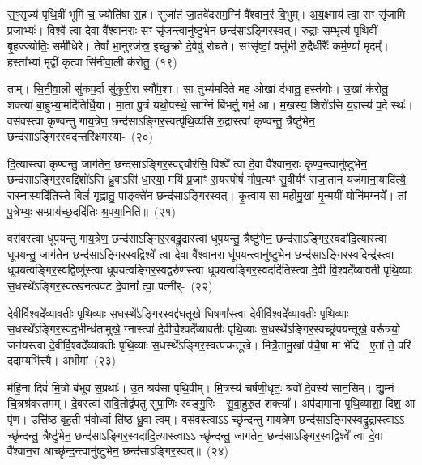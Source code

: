 स॒ꣳ॒सृज्य॑ पृथि॒वीं भूमिं॑ च॒ ज्योति॑षा स॒ह। सुजा॑तं जा॒तवे॑दसम॒ग्निं वै᳚श्वान॒रं वि॒भुम्। अ॒य॒क्ष्माय॑ त्वा॒ सꣳ सृ॑जामि प्र॒जाभ्यः॑। विश्वे᳚ त्वा दे॒वा वै᳚श्वान॒राः सꣳ सृ॑ज॒न्त्वानु॑ष्टुभेन॒ छन्द॑साऽङ्गिर॒स्वत्। रु॒द्राः स॒म्भृत्य॑ पृथि॒वीं बृ॒हज्ज्योतिः॒ समी॑धिरे। तेषां᳚ भा॒नुरज॑स्र॒ इच्छु॒क्रो दे॒वेषु॑ रोचते। सꣳसृ॑ष्टां॒ वसु॑भी रु॒द्रैर्धीरैः᳚ कर्म॒ण्यां᳚ मृदम्᳚। हस्ता᳚भ्यां मृ॒द्वीं कृ॒त्वा सि॑नीवा॒ली क॑रोतु॒~(१९)

ताम्। सि॒नी॒वा॒ली सु॑कप॒र्दा सु॑कुरी॒रा स्वौ॑प॒शा। सा तुभ्य॑मदिते मह॒ ओखां द॑धातु॒ हस्त॑योः। उ॒खां क॑रोतु॒ शक्त्या॑ बा॒हुभ्या॒मदि॑तिर्धि॒या। मा॒ता पु॒त्रं यथो॒पस्थे॒ साग्निं बि॑भर्तु॒ गर्भ॒ आ। म॒खस्य॒ शिरो॑\-ऽसि य॒ज्ञस्य॑ प॒दे स्थः॑। वस॑वस्त्वा कृण्वन्तु गाय॒त्रेण॒ छन्द॑साऽङ्गिर॒स्वत्पृ॑थि॒व्य॑सि रु॒द्रास्त्वा॑ कृण्वन्तु॒ त्रैष्टु॑भेन॒ छन्द॑साऽङ्गिर॒स्वद॒न्तरि॑क्षमस्या-~(२०)

दि॒त्यास्त्वा॑ कृण्वन्तु॒ जाग॑तेन॒ छन्द॑साऽङ्गिर॒स्वद्द्यौर॑सि॒ विश्वे᳚ त्वा दे॒वा वै᳚श्वान॒राः कृ॑ण्व॒न्त्वानु॑ष्टुभेन॒ छन्द॑साऽङ्गिर॒स्वद्दिशो॑\-ऽसि ध्रु॒वाऽसि॑ धा॒रया॒ मयि॑ प्र॒जाꣳ रा॒यस्पोषं॑ गौप॒त्यꣳ सु॒वीर्यꣳ॑ सजा॒तान् यज॑माना॒यादि॑त्यै॒ रास्ना॒स्यदि॑तिस्ते॒ बिलं॑ गृह्णातु॒ पाङ्क्ते॑न॒ छन्द॑साऽङ्गिर॒स्वत्। कृ॒त्वाय॒ सा म॒हीमु॒खां मृ॒न्मयीं॒ योनि॑म॒ग्नये᳚। तां पु॒त्रेभ्यः॒ सम्प्राय॑च्छ॒ददि॑तिः श्र॒पया॒निति॑॥~(२१)

{\anuvakamend[{मि॒त्रः क॑रोत्व॒न्तरि॑क्षमसि॒ प्र च॒त्वारि॑ च}]}%

वस॑वस्त्वा धूपयन्तु गाय॒त्रेण॒ छन्द॑साऽङ्गिर॒स्वद्रु॒द्रास्त्वा॑ धूपयन्तु॒ त्रैष्टु॑भेन॒ छन्द॑साऽङ्गिर॒स्वदा॑दि॒त्यास्त्वा॑ धूपयन्तु॒ जाग॑तेन॒ छन्द॑साऽङ्गिर॒स्वद्विश्वे᳚ त्वा दे॒वा वै᳚श्वान॒रा धू॑पय॒न्त्वानु॑ष्टुभेन॒ छन्द॑साऽङ्गिर॒स्वदिन्द्र॑स्त्वा धूपय\-त्वङ्गिर॒स्वद्विष्णु॑स्त्वा धूपय\-त्वङ्गिर॒स्वद्वरु॑णस्त्वा धूपय\-त्वङ्गिर॒स्वददि॑तिस्त्वा दे॒वी वि॒श्वदे᳚व्यावती पृथि॒व्याः स॒धस्थे᳚\-ऽङ्गिर॒स्वत्ख॑नत्ववट दे॒वानां᳚ त्वा॒ पत्नी᳚र्-~(२२)

दे॒वीर्वि॒श्वदे᳚व्यावतीः पृथि॒व्याः स॒धस्थे᳚\-ऽङ्गिर॒स्वद्द॑धतूखे धि॒षणा᳚स्त्वा दे॒वीर्वि॒श्वदे᳚व्यावतीः पृथि॒व्याः स॒धस्थे᳚\-ऽङ्गिर॒स्व\-द॒भीन्ध॑तामुखे॒ ग्नास्त्वा॑ दे॒वीर्वि॒श्वदे᳚व्यावतीः पृथि॒व्याः स॒धस्थे᳚\-ऽङ्गिर॒स्वच्छ्र॑पयन्तूखे॒ वरू᳚त्रयो॒ जन॑यस्त्वा दे॒वीर्वि॒श्वदे᳚व्यावतीः पृथि॒व्याः स॒धस्थे᳚\-ऽङ्गिर॒स्वत्प॑चन्तूखे। मित्रै॒तामु॒खां प॑चै॒षा मा भे॑दि। ए॒तां ते॒ परि॑ ददा॒म्यभि॑त्त्यै। अ॒भीमां~(२३)

म॑हि॒ना दिवं॑ मि॒त्रो ब॑भूव स॒प्रथाः᳚। उ॒त श्रव॑सा पृथि॒वीम्। मि॒त्रस्य॑ चर्\mbox{}षणी॒धृतः॒ श्रवो॑ दे॒वस्य॑ सान॒सिम्। द्यु॒म्नं चि॒त्रश्र॑वस्तमम्। दे॒वस्त्वा॑ सवि॒तोद्व॑पतु सुपा॒णिः स्व॑ङ्गु॒रिः। सु॒बा॒हुरु॒त शक्त्या᳚। अप॑द्यमाना पृथि॒व्याशा॒ दिश॒ आ पृ॑ण। उत्ति॑ष्ठ बृह॒ती भ॑वो॒र्ध्वा ति॑ष्ठ ध्रु॒वा त्वम्। वस॑व॒स्त्वा\-ऽ\-ऽ च्छृ॑न्दन्तु गाय॒त्रेण॒ छन्द॑सा\-ऽङ्गिर॒स्वद्रु॒द्रास्त्वा\-ऽ\-ऽ च्छृ॑न्दन्तु॒ त्रैष्टु॑भेन॒ छन्द॑सा\-ऽङ्गिर॒स्वदा॑दि॒त्यास्त्वा\-ऽ\-ऽ च्छृ॑न्दन्तु॒ जाग॑तेन॒ छन्द॑साऽङ्गिर॒स्वद्विश्वे᳚ त्वा दे॒वा वै᳚श्वान॒रा आच्छृ॑न्द॒न्त्वानु॑ष्टुभेन॒ छन्द॑साऽङ्गिर॒स्वत्॥~(२४)

